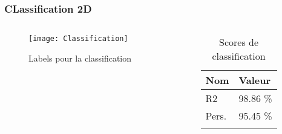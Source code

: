 \begin{frame}
    \frametitle{CLassification 2D}
    \begin{columns}
        \begin{column}{0.7\textwidth}
            \begin{figure}
            \texttt{[image: Classification]}       
            \caption{Labels pour la classification}
            \end{figure}
         \end{column}
         \begin{column}{0.3\textwidth}
            \begin{table}[h!]
                \caption{Scores de classification}
                \centering
                \begin{tabular}{l l}
                \toprule
                \textbf{Nom} & \textbf{Valeur} \\
                \midrule
                R2 & 98.86 \%\\
                Pers. & 95.45 \%\\
                \bottomrule\\
                \end{tabular}
            \end{table}
         \end{column}
    \end{columns}
\end{frame}


% 
